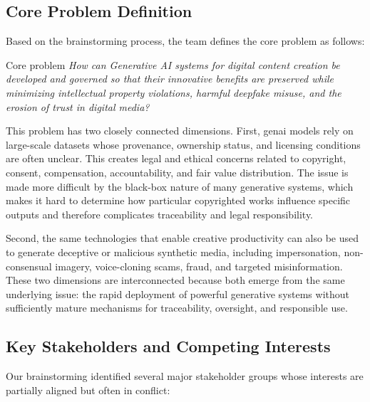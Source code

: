 \subsection{Core Problem Definition}\label{sec:core-problem}
Based on the brainstorming process, the team defines the core problem as follows:

\begin{keybox}{Core problem}
  \textit{How can Generative AI systems for digital content creation be developed and governed so that their innovative benefits are preserved while minimizing intellectual property violations, harmful deepfake misuse, and the erosion of trust in digital media?}
\end{keybox}

This problem has two closely connected dimensions. First, \ac{genai} models rely on large-scale datasets whose provenance, ownership status, and licensing conditions are often unclear. This creates legal and ethical concerns related to copyright, consent, compensation, accountability, and fair value distribution. The issue is made more difficult by the black-box nature of many generative systems, which makes it hard to determine how particular copyrighted works influence specific outputs and therefore complicates traceability and legal responsibility.

Second, the same technologies that enable creative productivity can also be used to generate deceptive or malicious synthetic media, including impersonation, non-consensual imagery, voice-cloning scams, fraud, and targeted misinformation. These two dimensions are interconnected because both emerge from the same underlying issue: the rapid deployment of powerful generative systems without sufficiently mature mechanisms for traceability, oversight, and responsible use.

\subsection{Key Stakeholders and Competing Interests}\label{sec:stakeholders}
Our brainstorming identified several major stakeholder groups whose interests are partially aligned but often in conflict:

